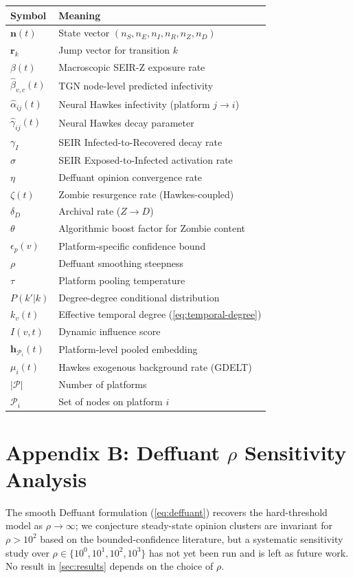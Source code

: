 \documentclass[11pt]{article}
\newcommand{\hv}{\mathbf{h}}
\newcommand{\bn}{\mathbf{n}}
\newcommand{\br}{\mathbf{r}}
\newcommand{\cP}{\mathcal{P}}
\begin{document}
\begin{center}
\begin{tabular}{ll}
\toprule
\textbf{Symbol} & \textbf{Meaning} \\
\midrule
$\bn(t)$ & State vector $(n_S,n_E,n_I,n_R,n_Z,n_D)$ \\
$\br_k$ & Jump vector for transition $k$ \\
$\beta(t)$ & Macroscopic SEIR-Z exposure rate \\
$\hat{\beta}_{v,c}(t)$ & TGN node-level predicted infectivity \\
$\hat{\alpha}_{ij}(t)$ & Neural Hawkes infectivity (platform $j\to i$) \\
$\hat{\gamma}_{ij}(t)$ & Neural Hawkes decay parameter \\
$\gamma_I$ & SEIR Infected-to-Recovered decay rate \\
$\sigma$ & SEIR Exposed-to-Infected activation rate \\
$\eta$ & Deffuant opinion convergence rate \\
$\zeta(t)$ & Zombie resurgence rate (Hawkes-coupled) \\
$\delta_D$ & Archival rate ($Z\to D$) \\
$\theta$ & Algorithmic boost factor for Zombie content \\
$\epsilon_p(v)$ & Platform-specific confidence bound \\
$\rho$ & Deffuant smoothing steepness \\
$\tau$ & Platform pooling temperature \\
$P(k'|k)$ & Degree-degree conditional distribution \\
$k_v(t)$ & Effective temporal degree (\cref{eq:temporal-degree}) \\
$I(v,t)$ & Dynamic influence score \\
$\hv_{\cP_i}(t)$ & Platform-level pooled embedding \\
$\mu_i(t)$ & Hawkes exogenous background rate (GDELT) \\
$|\cP|$ & Number of platforms \\
$\cP_i$ & Set of nodes on platform $i$ \\
\bottomrule
\end{tabular}
\end{center}

\section*{Appendix B: Deffuant $\rho$ Sensitivity Analysis}

The smooth Deffuant formulation (\cref{eq:deffuant}) recovers the hard-threshold
model as $\rho \to \infty$; we conjecture steady-state opinion clusters are
invariant for $\rho > 10^2$ based on the bounded-confidence literature, but a
systematic sensitivity study over $\rho \in \{10^0, 10^1, 10^2, 10^3\}$ has not
yet been run and is left as future work. No result in
\cref{sec:results} depends on the choice of $\rho$.
\end{document}
